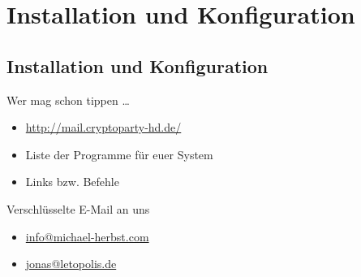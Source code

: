 \section{Installation und Konfiguration}
\subsection*{Installation und Konfiguration}
\begin{frame}{Wer mag schon tippen \dots}
	\begin{itemize}
		\item \url{http://mail.cryptoparty-hd.de/}
		\item Liste der Programme für euer System
		\item Links bzw. Befehle
	\end{itemize}
\end{frame}

\blackframe

%

\begin{frame}{Verschlüsselte E-Mail an uns}
	\begin{itemize}
		\item \url{info@michael-herbst.com}
		\item \url{jonas@letopolis.de}
	\end{itemize}
\end{frame}

\blackframe

%
%
%
%
